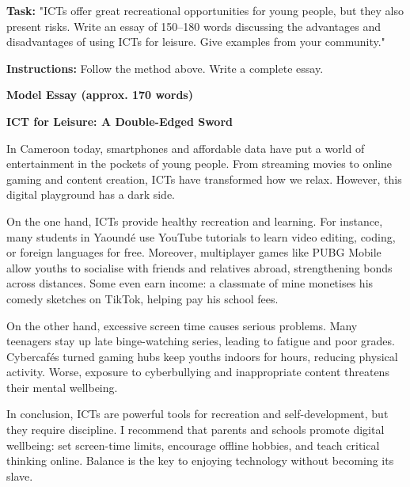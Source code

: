 \documentclass[11pt]{article}
\begin{document}
\begin{exoresolu}
\textbf{Task:} "ICTs offer great recreational opportunities for young people, but they also present risks. Write an essay of 150–180 words discussing the advantages and disadvantages of using ICTs for leisure. Give examples from your community."

\textbf{Instructions:} Follow the method above. Write a complete essay.

\tcblower
\textbf{Model Essay (approx. 170 words)}

\textbf{ICT for Leisure: A Double-Edged Sword}

In Cameroon today, smartphones and affordable data have put a world of entertainment in the pockets of young people. From streaming movies to online gaming and content creation, ICTs have transformed how we relax. However, this digital playground has a dark side.

On the one hand, ICTs provide healthy recreation and learning. For instance, many students in Yaoundé use YouTube tutorials to learn video editing, coding, or foreign languages for free. Moreover, multiplayer games like PUBG Mobile allow youths to socialise with friends and relatives abroad, strengthening bonds across distances. Some even earn income: a classmate of mine monetises his comedy sketches on TikTok, helping pay his school fees.

On the other hand, excessive screen time causes serious problems. Many teenagers stay up late binge-watching series, leading to fatigue and poor grades. Cybercafés turned gaming hubs keep youths indoors for hours, reducing physical activity. Worse, exposure to cyberbullying and inappropriate content threatens their mental wellbeing.

In conclusion, ICTs are powerful tools for recreation and self-development, but they require discipline. I recommend that parents and schools promote digital wellbeing: set screen-time limits, encourage offline hobbies, and teach critical thinking online. Balance is the key to enjoying technology without becoming its slave.


\end{exoresolu}
\end{document}
